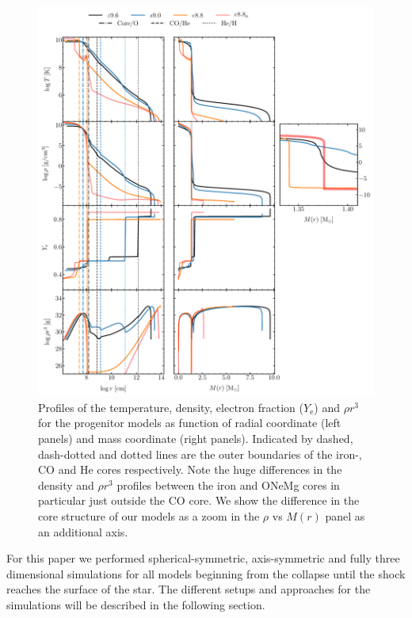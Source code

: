 \documentclass[fleqn,usenatbib]{mnras}
\begin{document}
\begin{figure}
 \centering
 \includegraphics[width=\textwidth]{./pic/progenitors_tem_rho_ye_rhor}
 \caption{Profiles of the temperature, density, electron fraction ($Y_{\text{e}}$) and $\rho r^3$ for the progenitor models as function of radial coordinate (left panels) and mass coordinate (right panels). Indicated by dashed, dash-dotted and dotted lines are the outer boundaries of the iron-, CO and He cores respectively. Note the huge differences in the density and $\rho r^3$ profiles between the iron and ONeMg cores in particular just outside the CO core. We show the difference in the core structure of our models as a zoom in the $\rho$ vs $M(r)$ panel as an additional axis.}
 \label{fig:prog_tem_rho_ye_rhor}
\end{figure}

For this paper we performed spherical-symmetric, axis-symmetric and fully three dimensional simulations for all models beginning from the collapse until the shock reaches the surface of the star. The different setups and approaches for the simulations will be described in the following section.
\end{document}
